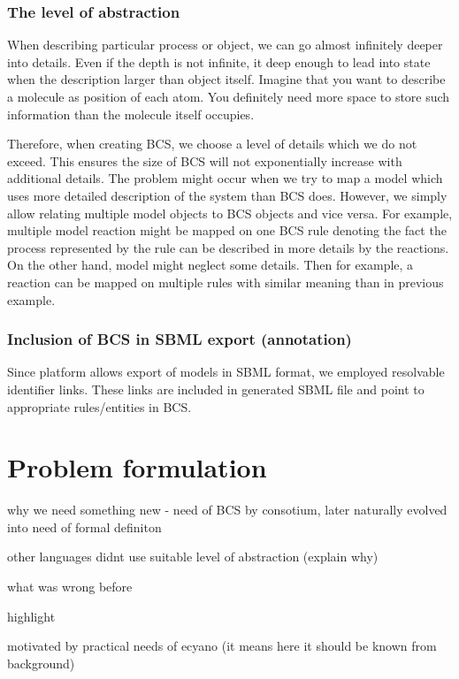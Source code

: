 \documentclass[12pt]{fithesis2}
\begin{document}
\subsection{The level of abstraction}

When describing particular process or object, we can go almost infinitely deeper into details. Even if the depth is not infinite, it deep enough to lead into state when the description larger than object itself. Imagine that you want to describe a molecule as position of each atom. You definitely need more space to store such information than the molecule itself occupies.

Therefore, when creating BCS, we choose a level of details which we do not exceed. This ensures the size of BCS will not exponentially increase with additional details. The problem might occur when we try to map a model which uses more detailed description of the system than BCS does. However, we simply allow relating multiple model objects to BCS objects and vice versa. For example, multiple model reaction might be mapped on one BCS rule denoting the fact the process represented by the rule can be described in more details by the reactions. On the other hand, model might neglect some details. Then for example, a reaction can be mapped on multiple rules with similar meaning than in previous example.

\subsection{Inclusion of BCS in SBML export (annotation)}

Since platform allows export of models in SBML format, we employed resolvable identifier links. These links are included in generated SBML file and point to appropriate rules/entities in BCS. 

\chapter{Problem formulation}

why we need something new - need of BCS by consotium, later naturally evolved into need of formal definiton

other languages didnt use suitable level of abstraction (explain why)

what was wrong before

highlight 

motivated by practical needs of ecyano (it means here it should be known from background)
\end{document}
